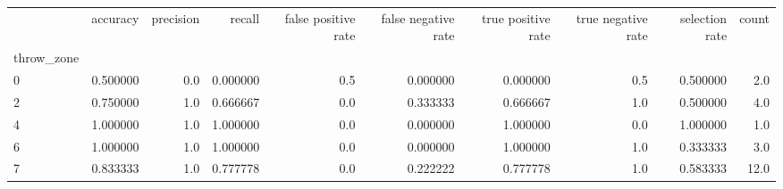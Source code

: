 \begin{tabular}{lrrrrrrrrr}
\toprule
{} &  accuracy &  precision &    recall &  false positive rate &  false negative rate &  true positive rate &  true negative rate &  selection rate &  count \\
throw\_zone &           &            &           &                      &                      &                     &                     &                 &        \\
\midrule
0          &  0.500000 &        0.0 &  0.000000 &                  0.5 &             0.000000 &            0.000000 &                 0.5 &        0.500000 &    2.0 \\
2          &  0.750000 &        1.0 &  0.666667 &                  0.0 &             0.333333 &            0.666667 &                 1.0 &        0.500000 &    4.0 \\
4          &  1.000000 &        1.0 &  1.000000 &                  0.0 &             0.000000 &            1.000000 &                 0.0 &        1.000000 &    1.0 \\
6          &  1.000000 &        1.0 &  1.000000 &                  0.0 &             0.000000 &            1.000000 &                 1.0 &        0.333333 &    3.0 \\
7          &  0.833333 &        1.0 &  0.777778 &                  0.0 &             0.222222 &            0.777778 &                 1.0 &        0.583333 &   12.0 \\
\bottomrule
\end{tabular}
